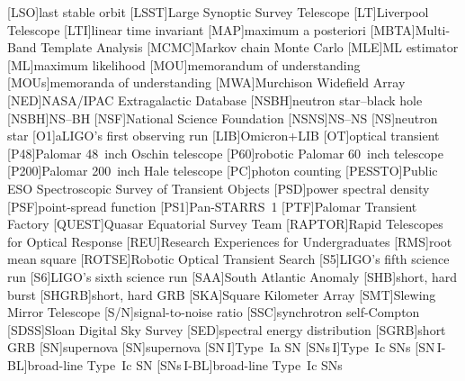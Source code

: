 \begin{acronym}
[LSO]{last stable orbit}
[LSST]{Large Synoptic Survey Telescope}
[LT]{Liverpool Telescope}
[LTI]{linear time invariant}
[MAP]{maximum a posteriori}
[MBTA]{Multi-Band Template Analysis}
[MCMC]{Markov chain Monte Carlo}
[MLE]{\ac{ML} estimator}
[ML]{maximum likelihood}
[MOU]{memorandum of understanding}
[MOUs]{memoranda of understanding}
[MWA]{Murchison Widefield Array}
[NED]{NASA/IPAC Extragalactic Database}
[NSBH]{neutron star\nobreakdashes--black hole}
[NSBH]{\acl{NS}\nobreakdashes--\acl{BH}}
[NSF]{National Science Foundation}
[NSNS]{\acl{NS}\nobreakdashes--\acl{NS}}
[NS]{neutron star}
[O1]{\acl{aLIGO}'s first observing run}
[LIB]{Omicron+\acl{LIB}}
[OT]{optical transient}
[P48]{Palomar 48~inch Oschin telescope}
[P60]{robotic Palomar 60~inch telescope}
[P200]{Palomar 200~inch Hale telescope}
[PC]{photon counting}
[PESSTO]{Public ESO Spectroscopic Survey of Transient Objects}
[PSD]{power spectral density}
[PSF]{point-spread function}
[PS1]{Pan\nobreakdashes-STARRS~1}
[PTF]{Palomar Transient Factory}
[QUEST]{Quasar Equatorial Survey Team}
[RAPTOR]{Rapid Telescopes for Optical Response}
[REU]{Research Experiences for Undergraduates}
[RMS]{root mean square}
[ROTSE]{Robotic Optical Transient Search}
[S5]{\ac{LIGO}'s fifth science run}
[S6]{\ac{LIGO}'s sixth science run}
[SAA]{South Atlantic Anomaly}
[SHB]{short, hard burst}
[SHGRB]{short, hard \acl{GRB}}
[SKA]{Square Kilometer Array}
[SMT]{Slewing Mirror Telescope}
[S/N]{signal\nobreakdashes-to\nobreakdashes-noise ratio}
[SSC]{synchrotron self\nobreakdashes-Compton}
[SDSS]{Sloan Digital Sky Survey}
[SED]{spectral energy distribution}
[SGRB]{short \acl{GRB}}
[SN]{supernova}
[SN]{supernova}
[\acs{SN}\,I]{Type~Ia \ac{SN}}
[\acsp{SN}\,I]{Type~Ic \acp{SN}}
[\acs{SN}\,I\nobreakdashes-BL]{broad\nobreakdashes-line Type~Ic \ac{SN}}
[\acsp{SN}\,I\nobreakdashes-BL]{broad\nobreakdashes-line Type~Ic \acp{SN}}

\end{acronym}
